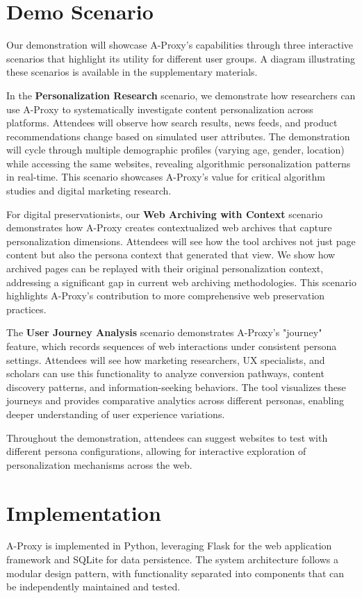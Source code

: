 \documentclass[sigconf]{acmart}
\begin{document}
\section{Demo Scenario}
Our demonstration will showcase A-Proxy's capabilities through three interactive scenarios that highlight its utility for different user groups. A diagram illustrating these scenarios is available in the supplementary materials.

In the \textbf{Personalization Research} scenario, we demonstrate how researchers can use A-Proxy to systematically investigate content personalization across platforms. Attendees will observe how search results, news feeds, and product recommendations change based on simulated user attributes. The demonstration will cycle through multiple demographic profiles (varying age, gender, location) while accessing the same websites, revealing algorithmic personalization patterns in real-time. This scenario showcases A-Proxy's value for critical algorithm studies and digital marketing research.

For digital preservationists, our \textbf{Web Archiving with Context} scenario demonstrates how A-Proxy creates contextualized web archives that capture personalization dimensions. Attendees will see how the tool archives not just page content but also the persona context that generated that view. We show how archived pages can be replayed with their original personalization context, addressing a significant gap in current web archiving methodologies. This scenario highlights A-Proxy's contribution to more comprehensive web preservation practices.

The \textbf{User Journey Analysis} scenario demonstrates A-Proxy's "journey" feature, which records sequences of web interactions under consistent persona settings. Attendees will see how marketing researchers, UX specialists, and scholars can use this functionality to analyze conversion pathways, content discovery patterns, and information-seeking behaviors. The tool visualizes these journeys and provides comparative analytics across different personas, enabling deeper understanding of user experience variations.

Throughout the demonstration, attendees can suggest websites to test with different persona configurations, allowing for interactive exploration of personalization mechanisms across the web.

\section{Implementation}
A-Proxy is implemented in Python, leveraging Flask for the web application framework and SQLite for data persistence. The system architecture follows a modular design pattern, with functionality separated into components that can be independently maintained and tested.
\end{document}
